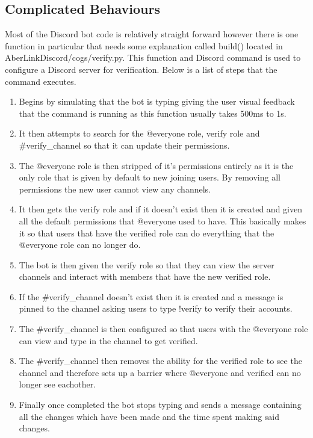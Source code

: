\subsection{Complicated Behaviours}\label{sec2:comp-behaviour}
Most of the Discord bot code is relatively straight forward however there is one function in particular that needs some explanation called build() located in AberLinkDiscord/cogs/verify.py. This function and Discord command is used to configure a Discord server for verification. Below is a list of steps that the command executes.

\begin{enumerate}
	\item Begins by simulating that the bot is typing giving the user visual feedback that the command is running as this function usually takes 500ms to 1s.
	\item It then attempts to search for the @everyone role, verify role and \#verify\_channel so that it can update their permissions.
	\item The @everyone role is then stripped of it's permissions entirely as it is the only role that is given by default to new joining users. By removing all permissions the new user cannot view any channels.
	\item It then gets the verify role and if it doesn't exist then it is created and given all the default permissions that @everyone used to have. This basically makes it so that users that have the verified role can do everything that the @everyone role can no longer do.
	\item The bot is then given the verify role so that they can view the server channels and interact with members that have the new verified role.
	\item If the \#verify\_channel doesn't exist then it is created and a message is pinned to the channel asking users to type !verify to verify their accounts.
	\item The \#verify\_channel is then configured so that users with the @everyone role can view and type in the channel to get verified.
	\item The \#verify\_channel then removes the ability for the verified role to see the channel and therefore sets up a barrier where @everyone and verified can no longer see eachother.
	\item Finally once completed the bot stops typing and sends a message containing all the changes which have been made and the time spent making said changes.
\end{enumerate}

